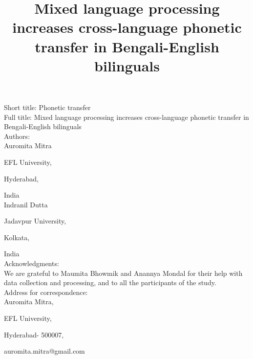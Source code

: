 \documentclass[12 pt]{article}
\title{Mixed language processing increases cross-language phonetic transfer in Bengali-English bilinguals}
\newlength\mystoreparindent
\newenvironment{myparindent}[1]{%
	\setlength{\mystoreparindent}{\the\parindent}
	\setlength{\parindent}{#1}
}{%
	\setlength{\parindent}{\mystoreparindent}
}
\begin{document}



\begin{singlespace}

\begin{myparindent}{0pt}
Short title: Phonetic transfer\\

Full title: Mixed language processing increases cross-language phonetic transfer in Bengali-English bilinguals\\

Authors:\\

Auromita Mitra

EFL University,

Hyderabad,

India\\

Indranil Dutta

Jadavpur University,

Kolkata,

India\\

Acknowledgments:\\
We are grateful to Maumita Bhowmik and Anannya Mondal for their help with data collection and processing, and to all the participants of the study.\\
 

Address for correspondence:\\
Auromita Mitra,

EFL University,

Hyderabad- 500007,

auromita.mitra@gmail.com

\end{myparindent}

\end{singlespace}
\end{document}

